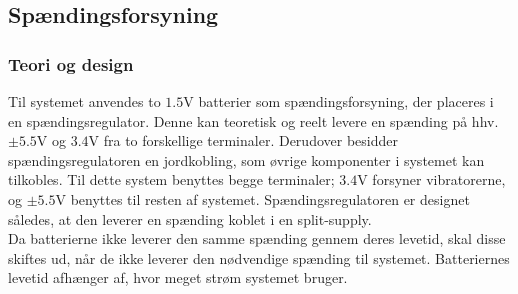 \subsection{Spændingsforsyning} \label{Spaendingsforsying}
\subsubsection{Teori og design}
Til systemet anvendes to $1.5$V batterier som spændingsforsyning, der placeres i en spændingsregulator. Denne kan teoretisk og reelt levere en spænding på hhv. $\pm5.5$V og $3.4$V fra to forskellige terminaler. Derudover besidder spændingsregulatoren en jordkobling, som øvrige komponenter i systemet kan tilkobles. Til dette system benyttes begge terminaler; $3.4$V forsyner vibratorerne, og $\pm5.5$V benyttes til resten af systemet. Spændingsregulatoren er designet således, at den leverer en spænding koblet i en split-supply.\\%
Da batterierne ikke leverer den samme spænding gennem deres levetid, skal disse skiftes ud, når de ikke leverer den nødvendige spænding til systemet. Batteriernes levetid afhænger af, hvor meget strøm systemet bruger. %


